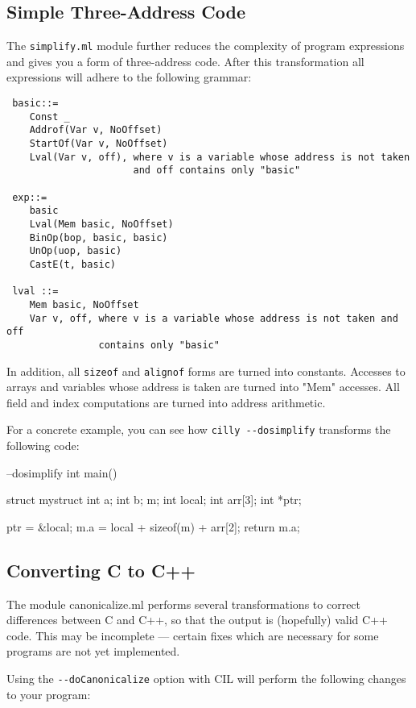 \documentclass{article}
\def\t#1{{\tt #1}}
\begin{document}
\subsection{Simple Three-Address Code} 

The \t{simplify.ml} module further reduces the complexity of program
expressions and gives you a form of three-address code. After this
transformation all expressions will adhere to the following grammar: 
\begin{verbatim}
 basic::=
    Const _ 
    Addrof(Var v, NoOffset)
    StartOf(Var v, NoOffset)
    Lval(Var v, off), where v is a variable whose address is not taken
                      and off contains only "basic"

 exp::=
    basic
    Lval(Mem basic, NoOffset)
    BinOp(bop, basic, basic)
    UnOp(uop, basic)
    CastE(t, basic)
   
 lval ::= 
    Mem basic, NoOffset
    Var v, off, where v is a variable whose address is not taken and off
                contains only "basic"
\end{verbatim}
In addition, all \t{sizeof} and \t{alignof} forms are turned into
constants. Accesses to arrays and variables whose address is taken are
turned into "Mem" accesses. All field and index computations are turned
into address arithmetic.

For a concrete example, you can see how \t{cilly -{}-dosimplify} 
transforms the following code:

\begin{cilcode}[global] --dosimplify
  int main() {
    struct mystruct {
      int a;
      int b;
    } m;
    int local;
    int arr[3];
    int *ptr;

    ptr = &local;
    m.a = local + sizeof(m) + arr[2];
    return m.a; 
  } 
\end{cilcode}

\subsection{Converting C to C++}

The module canonicalize.ml performs several transformations to correct
differences between C and C++, so that the output is (hopefully) valid
C++ code.  This may be incomplete --- certain fixes which are necessary
for some programs are not yet implemented.

Using the \t{-{}-doCanonicalize} option with CIL will perform the
following changes to your program:
\end{document}
